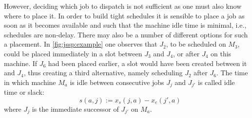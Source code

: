 \documentclass[twocolumn]{svjour3}
\begin{document}
However, deciding which job to dispatch is not sufficient as one must also know 
where to place it. In order to build tight schedules it is sensible to place a 
job as soon as it becomes available and such that the machine idle time is 
minimal, i.e., schedules are non-delay. 
There may also be a number of different options for such a placement. 
In \cref{fig:jssp:example} one observes that $J_2$, to be scheduled on $M_3$, 
could be placed immediately in a slot between $J_3$ and $J_4$, or after $J_4$ 
on this machine. 
If $J_6$ had been placed earlier, a slot would have been created between it and 
$J_4$, thus creating a third alternative, namely scheduling $J_2$ after $J_6$. 
The time in which machine $M_a$ is idle between consecutive jobs $J_j$ and 
$J_{j'}$ is called idle time or slack:
\begin{equation}\quad 
s(a,j):=x_s(j,a)-x_e(j',a) \label{eq:slack}
\end{equation}
where $J_j$ is the immediate successor of $J_{j'}$ on $M_a$. 
\end{document}
